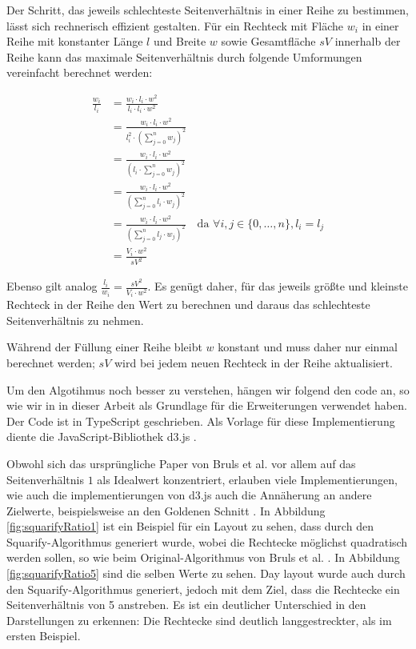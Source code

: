 \smallskip

Der Schritt, das jeweils schlechteste Seitenverhältnis in einer Reihe zu bestimmen, lässt sich rechnerisch effizient gestalten. Für ein Rechteck mit Fläche $w_i$ in einer Reihe mit konstanter Länge $l$ und Breite $w$ sowie Gesamtfläche $sV$ innerhalb der Reihe kann das maximale Seitenverhältnis durch folgende Umformungen vereinfacht berechnet werden:

\begin{align}
    \frac{w_i}{l_i} 
    &= \frac{w_i \cdot l_i \cdot w^2}{l_i \cdot l_i \cdot w^2} \\
    &= \frac{w_i \cdot l_i \cdot w^2}{l_i^2 \cdot \left(\sum_{j=0}^{n} w_j\right)^2} \\
    &= \frac{w_i \cdot l_i \cdot w^2}{\left(l_i \cdot \sum_{j=0}^{n} w_j\right)^2} \\
    &= \frac{w_i \cdot l_i \cdot w^2}{\left(\sum_{j=0}^{n} l_i \cdot w_j\right)^2} \\
    &= \frac{w_i \cdot l_i \cdot w^2}{\left(\sum_{j=0}^{n} l_j \cdot w_j\right)^2}
    \quad\text{da } \forall i, j \in \{0, \dots, n\}, l_i = l_j \\
    &= \frac{V_i \cdot w^2}{sV^2}
\end{align}

Ebenso gilt analog $ \frac{l_i}{w_i} = \frac{sV^2}{V_i \cdot w^2} $. Es genügt daher, für das jeweils größte und kleinste Rechteck in der Reihe den Wert zu berechnen und daraus das schlechteste Seitenverhältnis zu nehmen.

Während der Füllung einer Reihe bleibt $w$ konstant und muss daher nur einmal berechnet werden; $sV$ wird bei jedem neuen Rechteck in der Reihe aktualisiert.

Um den Algotihmus noch besser zu verstehen, hängen wir folgend den code an, so wie wir in in dieser Arbeit als Grundlage für die Erweiterungen verwendet haben. Der Code ist in TypeScript geschrieben. Als Vorlage für diese Implementierung diente die JavaScript-Bibliothek d3.js \cite{d3_treemap_code}.



\smallskip

Obwohl sich das ursprüngliche Paper von Bruls et al. \cite{bruls2000squarified} vor allem auf das Seitenverhältnis $1$ als Idealwert konzentriert, erlauben viele Implementierungen, wie auch die implementierungen von d3.js \cite{d3_treemap_code} auch die Annäherung an andere Zielwerte, beispielsweise an den Goldenen Schnitt \cite{goldenRatio}. 
In Abbildung \ref{fig:squarifyRatio1} ist ein Beispiel für ein Layout zu sehen, dass durch den Squarify-Algorithmus generiert wurde, wobei die Rechtecke möglichst quadratisch werden sollen, so wie beim Original-Algorithmus von Bruls et al. \cite{bruls2000squarified}. In Abbildung \ref{fig:squarifyRatio5} sind die selben Werte zu sehen. Day layout wurde auch durch den Squarify-Algorithmus generiert, jedoch mit dem Ziel, dass die Rechtecke ein Seitenverhältnis von 5 anstreben. Es ist ein deutlicher Unterschied in den Darstellungen zu erkennen: Die Rechtecke sind deutlich langgestreckter, als im ersten Beispiel.


